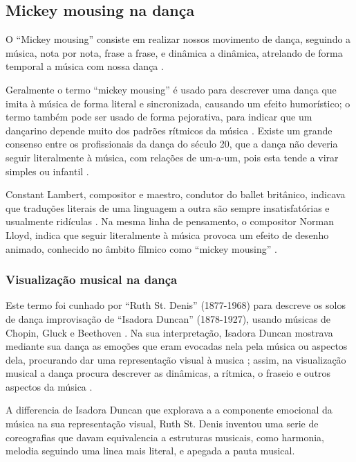 \subsection{Mickey mousing na dança} 

O ``Mickey mousing'' consiste em realizar nossos movimento de dança,
seguindo a música, nota por nota, frase a frase, e dinâmica a dinâmica,
atrelando de forma temporal a música com nossa dança
\cite[pp. 460]{preston1995dance}.

Geralmente o termo ``mickey mousing'' é usado para descrever 
uma dança que imita à música de forma literal e sincronizada, causando um efeito humorístico;
o termo também pode ser usado de forma pejorativa, 
para indicar que um dançarino depende muito dos padrões rítmicos da música \cite{butterworth2011dance}.
Existe um grande consenso entre os profissionais da dança do século 20,
que a dança não deveria seguir literalmente à música, com relações de um-a-um, 
pois esta tende a virar simples ou infantil \cite[pp. 242-243]{dithmer2002another}.

Constant Lambert,  compositor e maestro, condutor do ballet britânico,
indicava que traduções literais de uma linguagem a outra são sempre insatisfatórias 
e usualmente ridículas \cite[pp. 242-243]{dithmer2002another}.
Na mesma linha de pensamento, o compositor Norman Lloyd,
indica que seguir literalmente à música provoca um efeito de desenho animado,
conhecido no âmbito fílmico como ``mickey mousing''
\cite[pp. 242-243]{dithmer2002another}.

\subsubsection{Visualização musical na dança}
\label{subsubsec:musicvisualization}
Este termo foi cunhado por ``Ruth St. Denis'' (1877-1968) 
para descreve os solos de dança improvisação  de ``Isadora Duncan'' (1878-1927),
usando músicas de Chopin, Gluck e Beethoven \cite{butterworth2011dance} \cite[pp. 473]{runco1999encyclopedia}.
Na sua interpretação, 
Isadora Duncan mostrava mediante sua dança as emoções que eram evocadas nela pela música 
ou aspectos dela, procurando dar uma representação visual à musica
\cite{butterworth2011dance} \cite[pp. 473]{runco1999encyclopedia};
assim, na visualização musical a dança procura descrever as dinâmicas, a rítmica, o fraseio 
e outros aspectos da música \cite[pp. 29]{schrader2005sense}.

A differencia de Isadora Duncan que explorava a a componente emocional da música na sua representação visual,
Ruth St. Denis inventou uma serie de coreografias que davam equivalencia a estruturas musicais,
como harmonia, melodia \cite[pp. 149]{walden2013representation} seguindo uma linea mais literal,
e apegada a pauta musical.

